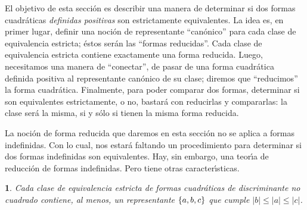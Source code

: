 \theoremstyle{plain}
\newtheorem{teoReducidas}{\teoname}[section]
\newtheorem{lemaReducidas}[teoReducidas]{\lemaname}
\newtheorem{coroReducidas}[teoReducidas]{\coroname}

\theoremstyle{definition}
\newtheorem{defReducidas}[teoReducidas]{}
\newtheorem{obsReducidas}[teoReducidas]{\obsname}
\newtheorem{ejemReducidas}[teoReducidas]{\ejemname}


El objetivo de esta secci\'on es describir una manera de
determinar si dos formas cuadr\'aticas \emph{definidas positivas}
son estrictamente equivalentes.
La idea es, en primer lugar, definir una noci\'on de representante
``can\'onico'' para cada clase de equivalencia estricta; \'estos
ser\'an las ``formas reducidas''. Cada clase de equivalencia estricta
contiene exactamente una forma reducida. Luego, necesitamos una manera
de ``conectar'', de pasar de una forma cuadr\'atica definida positiva
al representante can\'onico de su clase; diremos que ``reducimos'' la
forma cuadr\'atica. Finalmente, para poder comparar dos formas, determinar
si son equivalentes estrictamente, o no, bastar\'a con reducirlas y
compararlas: la clase ser\'a la misma, si y s\'olo si tienen la misma
forma reducida.

La noci\'on de forma reducida que daremos en esta secci\'on
no se aplica a formas indefinidas.
Con lo cual, nos estar\'a faltando un procedimiento para
determinar si dos formas indefinidas son equivalentes.
Hay, sin embargo, una teor\'{\i}a de reducci\'on de formas indefinidas.
Pero tiene otras caracter\'{\i}sticas.

\begin{lemaReducidas}\label{lema:reducidas}
	Cada clase de equivalencia estricta de formas cuadr\'aticas
	de discriminante no cuadrado
	contiene, al menos, un representante $\left\{a,b,c\right\}$ que cumple
	$|b|\leq |a|\leq |c|$.
\end{lemaReducidas}

